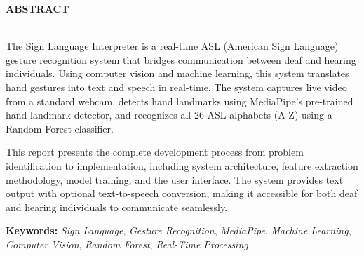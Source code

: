 {\centerline { {\large \textbf{ABSTRACT}}}}
~\\

The Sign Language Interpreter is a real-time ASL (American Sign Language) gesture recognition system that bridges communication between deaf and hearing individuals. Using computer vision and machine learning, this system translates hand gestures into text and speech in real-time. The system captures live video from a standard webcam, detects hand landmarks using MediaPipe's pre-trained hand landmark detector, and recognizes all 26 ASL alphabets (A-Z) using a Random Forest classifier.

This report presents the complete development process from problem identification to implementation, including system architecture, feature extraction methodology, model training, and the user interface. The system provides text output with optional text-to-speech conversion, making it accessible for both deaf and hearing individuals to communicate seamlessly.

\vskip 0.5cm
\noindent
\textbf{Keywords:} {\it Sign Language}, {\it Gesture Recognition}, {\it MediaPipe}, {\it Machine Learning}, {\it Computer Vision}, {\it Random Forest}, {\it Real-Time Processing}